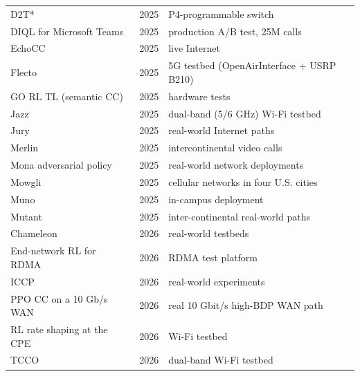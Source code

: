 \begin{small}
\begin{longtable}{@{}L{4.0cm}lL{8.6cm}@{}}
D2T*~\cite{liu2025automatic} & 2025 & P4-programmable switch \\
DIQL for Microsoft Teams~\cite{khairy2026human} & 2025 & production A/B test, 25M calls \\
EchoCC~\cite{yu2025echocc} & 2025 & live Internet \\
Flecto~\cite{serra2025flecto} & 2025 & 5G testbed (OpenAirInterface + USRP B210) \\
GO RL TL (semantic CC)~\cite{kutsevol2025learning} & 2025 & hardware tests \\
Jazz~\cite{wang2025edge} & 2025 & dual-band (5/6 GHz) Wi-Fi testbed \\
Jury~\cite{tian2025jury} & 2025 & real-world Internet paths \\
Merlin~\cite{gottipati2025offline} & 2025 & intercontinental video calls \\
Mona adversarial policy~\cite{chen2025exploring} & 2025 & real-world network deployments \\
Mowgli~\cite{agarwal2025mowgli} & 2025 & cellular networks in four U.S. cities \\
Muno~\cite{tu2025muno} & 2025 & in-campus deployment \\
Mutant~\cite{pappone2025mutant} & 2025 & inter-continental real-world paths \\
Chameleon~\cite{su2026chameleon} & 2026 & real-world testbeds \\
End-network RL for RDMA~\cite{pan2026end} & 2026 & RDMA test platform \\
ICCP~\cite{ji2026iccp} & 2026 & real-world experiments \\
PPO CC on a 10 Gb/s WAN~\cite{ghermezian2026ppo} & 2026 & real 10 Gbit/s high-BDP WAN path \\
RL rate shaping at the CPE~\cite{xue2026taming} & 2026 & Wi-Fi testbed \\
TCCO~\cite{zhang2026transformer} & 2026 & dual-band Wi-Fi testbed \\
\end{longtable}
\end{small}
